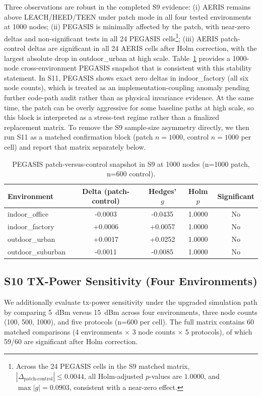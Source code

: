 ﻿\documentclass[sensors,article,submit,moreauthors,pdftex]{Definitions/mdpi}
\begin{document}
Three observations are robust in the completed S9 evidence: (i) AERIS remains above LEACH/HEED/TEEN under patch mode in all four tested environments at 1000 nodes; (ii) PEGASIS is minimally affected by the patch, with near-zero deltas and non-significant tests in all 24 PEGASIS cells\footnote{Across the 24 PEGASIS cells in the S9 matched matrix, \(|\Delta_{\text{patch-control}}| \le 0.0044\), all Holm-adjusted \(p\)-values are \(1.0000\), and \(\max |g| = 0.0903\), consistent with a near-zero effect.}; (iii) AERIS patch-control deltas are significant in all 24 AERIS cells after Holm correction, with the largest absolute drop in outdoor\_urban at high scale. Table~\ref{tab:s9_pegasis_1000} provides a 1000-node cross-environment PEGASIS snapshot that is consistent with this stability statement. In S11, PEGASIS shows exact zero deltas in indoor\_factory (all six node counts), which is treated as an implementation-coupling anomaly pending further code-path audit rather than as physical invariance evidence. At the same time, the patch can be overly aggressive for some baseline paths at high scale, so this block is interpreted as a stress-test regime rather than a finalized replacement matrix. To remove the S9 sample-size asymmetry directly, we then run S11 as a matched confirmation block (patch \(n=1000\), control \(n=1000\) per cell) and report that matrix separately below.

\begin{table}[H]
\caption{PEGASIS patch-versus-control snapshot in S9 at 1000 nodes (n=1000 patch, n=600 control).}
\label{tab:s9_pegasis_1000}
\centering
\begin{tabular}{lcccc}
\toprule
Environment & Delta (patch-control) & Hedges' $g$ & Holm $p$ & Significant \\
\midrule
indoor\_office    & -0.0003 & -0.0435 & 1.0000 & No \\
indoor\_factory   & +0.0006 & +0.0057 & 1.0000 & No \\
outdoor\_urban    & +0.0017 & +0.0252 & 1.0000 & No \\
outdoor\_suburban & -0.0011 & -0.0085 & 1.0000 & No \\
\bottomrule
\end{tabular}
\end{table}

\subsection{S10 TX-Power Sensitivity (Four Environments)}
We additionally evaluate tx-power sensitivity under the upgraded simulation path by comparing \SI{5}{dBm} versus \SI{15}{dBm} across four environments, three node counts (100, 500, 1000), and five protocols (n=600 per cell). The full matrix contains 60 matched comparisons (4 environments $\times$ 3 node counts $\times$ 5 protocols), of which 59/60 are significant after Holm correction.
\end{document}
